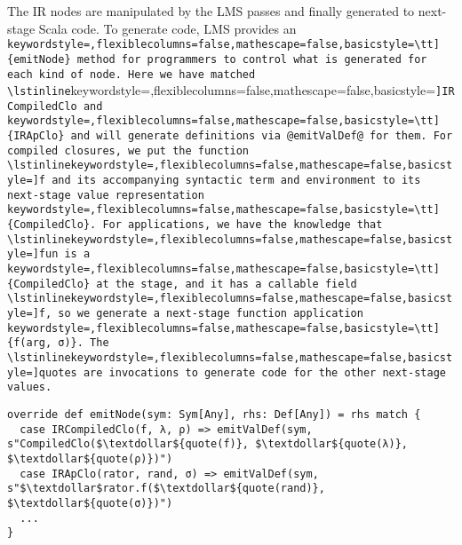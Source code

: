 The IR nodes are manipulated by the LMS passes and finally generated to
next-stage Scala code. To generate code, LMS provides an \lstinline[keywordstyle=,flexiblecolumns=false,mathescape=false,basicstyle=\tt]{emitNode} method for
programmers to control what is generated for each kind of node. Here we have
matched \lstinline[keywordstyle=,flexiblecolumns=false,mathescape=false,basicstyle=\tt]{IRCompiledClo} and \lstinline[keywordstyle=,flexiblecolumns=false,mathescape=false,basicstyle=\tt]{IRApClo} and will generate definitions via @emitValDef@ for them.
For compiled closures, we put the function \lstinline[keywordstyle=,flexiblecolumns=false,mathescape=false,basicstyle=\tt]{f} and its accompanying syntactic term
and environment to its next-stage value representation \lstinline[keywordstyle=,flexiblecolumns=false,mathescape=false,basicstyle=\tt]{CompiledClo}. For
applications, we have the knowledge that \lstinline[keywordstyle=,flexiblecolumns=false,mathescape=false,basicstyle=\tt]{fun} is a \lstinline[keywordstyle=,flexiblecolumns=false,mathescape=false,basicstyle=\tt]{CompiledClo} at the stage,
and it has a callable field \lstinline[keywordstyle=,flexiblecolumns=false,mathescape=false,basicstyle=\tt]{f}, so we generate a next-stage function
application \lstinline[keywordstyle=,flexiblecolumns=false,mathescape=false,basicstyle=\tt]{f(arg, σ)}. The \lstinline[keywordstyle=,flexiblecolumns=false,mathescape=false,basicstyle=\tt]{quote}s are invocations to generate code for the
other next-stage values.
\begin{lstlisting}
override def emitNode(sym: Sym[Any], rhs: Def[Any]) = rhs match {
  case IRCompiledClo(f, λ, ρ) => emitValDef(sym, s"CompiledClo($\textdollar${quote(f)}, $\textdollar${quote(λ)}, $\textdollar${quote(ρ)})")
  case IRApClo(rator, rand, σ) => emitValDef(sym, s"$\textdollar$rator.f($\textdollar${quote(rand)}, $\textdollar${quote(σ)})")
  ...
}
\end{lstlisting}
